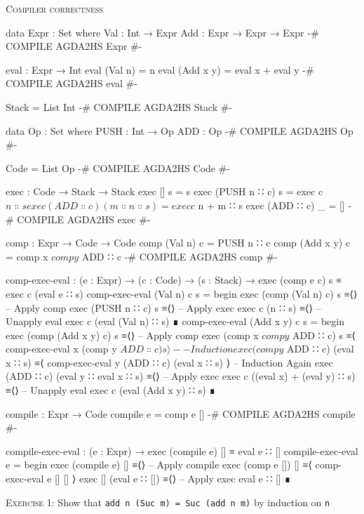 \documentclass{article}
\begin{document}
\noindent
\textsc{Compiler correctness}

\begin{code}
data Expr : Set where
    Val : Int → Expr
    Add : Expr → Expr → Expr
{-# COMPILE AGDA2HS Expr #-}

eval : Expr → Int
eval (Val n) = n
eval (Add x y) = eval x + eval y
{-# COMPILE AGDA2HS eval #-}

Stack = List Int
{-# COMPILE AGDA2HS Stack #-}

data Op : Set where
    PUSH : Int → Op
    ADD : Op
{-# COMPILE AGDA2HS Op #-}
\end{code}

\begin{code}
Code = List Op
{-# COMPILE AGDA2HS Code #-}

exec : Code → Stack → Stack
exec [] s = s
exec (PUSH n ∷ c) s = exec c $ n ∷ s
exec (ADD ∷ c) (m ∷ n ∷ s) = exec c $ n + m ∷ s
exec (ADD ∷ c) _ = []
{-# COMPILE AGDA2HS exec #-}

comp : Expr → Code → Code
comp (Val n) c = PUSH n ∷ c
comp (Add x y) c = comp x $ comp y $ ADD ∷ c
{-# COMPILE AGDA2HS comp #-}

comp-exec-eval : (e : Expr) → (c : Code) → (s : Stack)
    → exec (comp e c) s ≡ exec c (eval e ∷ s)
comp-exec-eval (Val n) c s =
  begin
    exec (comp (Val n) c) s
  ≡⟨⟩ -- Apply comp
    exec (PUSH n ∷ c) s
  ≡⟨⟩ -- Apply exec
    exec c (n ∷ s)
  ≡⟨⟩ -- Unapply eval
    exec c (eval (Val n) ∷ s)
  ∎
comp-exec-eval (Add x y) c s =
  begin
    exec (comp (Add x y) c) s
  ≡⟨⟩ -- Apply comp
    exec (comp x $ comp y $ ADD ∷ c) s
  ≡⟨ comp-exec-eval x (comp y $ ADD ∷ c) s ⟩ -- Induction
    exec (comp y $ ADD ∷ c) (eval x ∷ s)
  ≡⟨ comp-exec-eval y (ADD ∷ c) (eval x ∷ s) ⟩ -- Induction Again
    exec (ADD ∷ c) (eval y ∷ eval x ∷ s)
  ≡⟨⟩ -- Apply exec
    exec c ((eval x) + (eval y) ∷ s)
  ≡⟨⟩ -- Unapply eval
    exec c (eval (Add x y) ∷ s)
  ∎

compile : Expr → Code
compile e = comp e []
{-# COMPILE AGDA2HS compile #-}

compile-exec-eval : (e : Expr) → exec (compile e) [] ≡ eval e ∷ []
compile-exec-eval e =
  begin
    exec (compile e) []
  ≡⟨⟩ -- Apply compile
    exec (comp e []) []
  ≡⟨ comp-exec-eval e [] [] ⟩
    exec [] (eval e ∷ [])
  ≡⟨⟩ -- Apply exec
    eval e ∷ []
  ∎
\end{code}

\noindent
\textsc{Exercise 1}: Show that \verb!add n (Suc m) = Suc (add n m)! by induction on \texttt{n}
\end{document}
